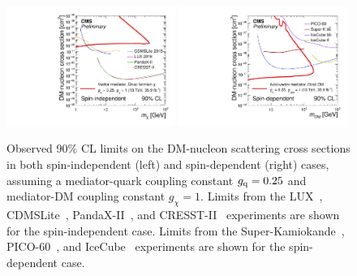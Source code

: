 \begin{figure}[hbtp]
  \centering
  \includegraphics[width=0.49\textwidth]{figures/Zwimps_13TeV_DM_NucleonXS_SI.pdf}
  \includegraphics[width=0.49\textwidth]{figures/Zwimps_13TeV_DM_NucleonXS_SD.pdf}
  \caption{Observed 90\% CL limits on the DM-nucleon scattering cross sections
          in both spin-independent (left) and spin-dependent (right) cases,
          assuming a mediator-quark coupling constant $g_{\rm q} = 0.25$ and mediator-DM coupling constant $g_{\chi} = 1$. 
          Limits from the LUX~\cite{Akerib:2015rjg}, \mbox{CDMSLite}~\cite{Agnese:2015nto}, PandaX-II~\cite{Tan:2016zwf}, and CRESST-II~\cite{Angloher:2015ewa} experiments are shown for the
          spin-independent case. Limits from the Super-Kamiokande~\cite{Choi:2015ara}, PICO-60~\cite{Amole:2017dex}, and
          IceCube~\cite{Aartsen:2016zhm,Aartsen:2016exj} experiments are shown for the spin-dependent case.
        } 
  \label{fig:DDlimits}
\end{figure}

